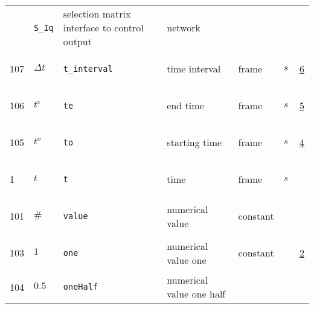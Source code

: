 \begin{longtable}{|p{1cm}|p{2.5cm}|p{4.5cm}|p{8cm}|p{3.0cm}|p{3cm}|p{1cm}|}
             & \verb|S_Iq|
             & selection matrix interface to control output
             & \begin{lay}network \end{lay}
             & $  $
             & \\
            107
             & \hypertarget{"v:107"}{ $ {{\Delta t}}{_{}} $}
             & \verb|t_interval|
             & time interval
             & \begin{lay}frame \end{lay}
             & $ s \, $
             &                 \hyperlink{"e:6"}{ 6 }
                 \\
            106
             & \hypertarget{"v:106"}{ $ {{t^e}}{_{}} $}
             & \verb|te|
             & end time
             & \begin{lay}frame \end{lay}
             & $ s \, $
             &                 \hyperlink{"e:5"}{ 5 }
                 \\
            105
             & \hypertarget{"v:105"}{ $ {{t^o}}{_{}} $}
             & \verb|to|
             & starting time
             & \begin{lay}frame \end{lay}
             & $ s \, $
             &                 \hyperlink{"e:4"}{ 4 }
                 \\
            1
             & \hypertarget{"v:1"}{ $ {t}{_{}} $}
             & \verb|t|
             & time
             & \begin{lay}frame \end{lay}
             & $ s \, $
             & \\
            101
             & \hypertarget{"v:101"}{ $ {{\#}}{_{}} $}
             & \verb|value|
             & numerical value
             & \begin{lay}constant \end{lay}
             & $  $
             & \\
            103
             & \hypertarget{"v:103"}{ $ {1}{_{}} $}
             & \verb|one|
             & numerical value one
             & \begin{lay}constant \end{lay}
             & $  $
             &                 \hyperlink{"e:2"}{ 2 }
                 \\
            104
             & \hypertarget{"v:104"}{ $ {0.5}{_{}} $}
             & \verb|oneHalf|
             & numerical value one half

\end{longtable}

